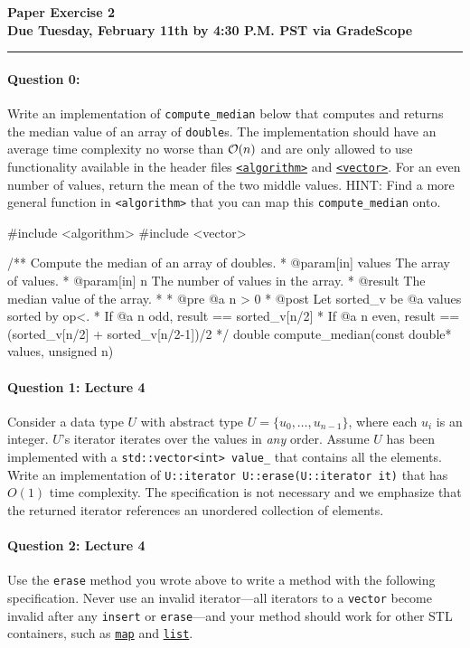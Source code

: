 \documentclass[12pt,letterpaper,twoside]{article}
\begin{document}
{\centering \textbf{Paper Exercise 2\\ Due Tuesday, February 11th by
    4:30 P.M. PST via GradeScope\\}}
\vspace*{-8pt}\noindent\rule{\linewidth}{1pt}

\paragraph{Question 0: } Write an implementation of {\tt compute\_median} below that computes and returns the median value of an array of {\tt double}s. The implementation should have an average time complexity no worse than $\mathcal{O}(n)$ and are only allowed to use functionality available in the header files \href{https://en.cppreference.com/w/cpp/algorithm}{{\tt <algorithm>}} and \href{https://en.cppreference.com/w/cpp/container/vector}{{\tt <vector>}}. For an even number of values, return the mean of the two middle values. HINT: Find a more general function in {\tt <algorithm>} that you can map this {\tt compute\_median} onto.
\begin{cpp}
#include <algorithm>
#include <vector>

/** Compute the median of an array of doubles.
 * @param[in] values  The array of values.
 * @param[in]      n  The number of values in the array.
 * @result The median value of the array.
 *
 * @pre @a n > 0
 * @post Let sorted_v be @a values sorted by op<.
 *         If @a n odd,  result ==  sorted_v[n/2]
 *         If @a n even, result == (sorted_v[n/2] + sorted_v[n/2-1])/2
 */
double compute_median(const double* values, unsigned n)
\end{cpp}


\paragraph{Question 1: Lecture 4} Consider a data type $U$ with abstract type $U =
\{u_0,\dots,u_{n-1}\}$, where each $u_i$ is an integer. $U$'s iterator
iterates over the values in \emph{any} order. Assume $U$ has been implemented with a \texttt{std::vector<int> value\_} that contains all the elements. Write an
implementation of \texttt{U::iterator U::erase(U::iterator it)} that
has $O(1)$ time complexity. The specification is not necessary and we
emphasize that the returned iterator references an unordered
collection of elements.


\paragraph{Question 2: Lecture 4} Use the \texttt{erase} method you wrote above to write a method with the
following specification. Never use an invalid iterator---all iterators to a
\texttt{vector} become invalid after any \texttt{insert} or
\texttt{erase}---and your method should work for other STL containers, such
as \href{https://en.cppreference.com/w/cpp/container/map}{\texttt{map}} and 
\href{https://en.cppreference.com/w/cpp/container/list}{\texttt{list}}.
\end{document}
